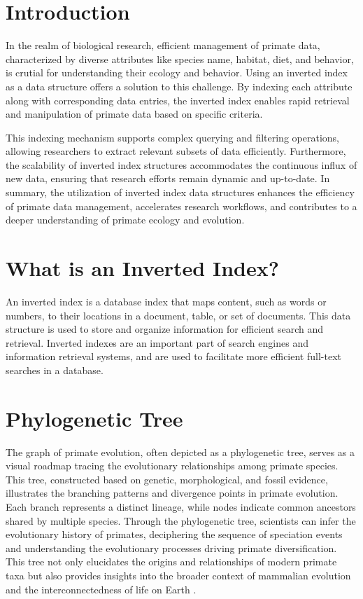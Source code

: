 \documentclass[a4paper,20pt,titlepage]{article}
\begin{document}
\section{Introduction}

In the realm of biological research, efficient management of primate data, characterized by diverse attributes like species name, habitat, diet, and behavior, is crutial for understanding their ecology and behavior. Using an inverted index as a data structure offers a solution to this challenge. By indexing each attribute along with corresponding data entries, the inverted index enables rapid retrieval and manipulation of primate data based on specific criteria.

This indexing mechanism supports complex querying and filtering operations, allowing researchers to extract relevant subsets of data efficiently. Furthermore, the scalability of inverted index structures accommodates the continuous influx of new data, ensuring that research efforts remain dynamic and up-to-date. In summary, the utilization of inverted index data structures enhances the efficiency of primate data management, accelerates research workflows, and contributes to a deeper understanding of primate ecology and evolution.


\section{What is an Inverted Index?}
An inverted index is a database index that maps content, such as words or numbers, to their locations in a document, table, or set of documents. This data structure is used to store and organize information for efficient search and retrieval. Inverted indexes are an important part of search engines and information retrieval systems, and are used to facilitate more efficient full-text searches in a database.

\section{Phylogenetic Tree}
The graph of primate evolution, often depicted as a phylogenetic tree, serves as a visual roadmap tracing the evolutionary relationships among primate species. This tree, constructed based on genetic, morphological, and fossil evidence, illustrates the branching patterns and divergence points in primate evolution. Each branch represents a distinct lineage, while nodes indicate common ancestors shared by multiple species. Through the phylogenetic tree, scientists can infer the evolutionary history of primates, deciphering the sequence of speciation events and understanding the evolutionary processes driving primate diversification. This tree not only elucidates the origins and relationships of modern primate taxa but also provides insights into the broader context of mammalian evolution and the interconnectedness of life on Earth \cite{KhanAcademy}.
\end{document}
